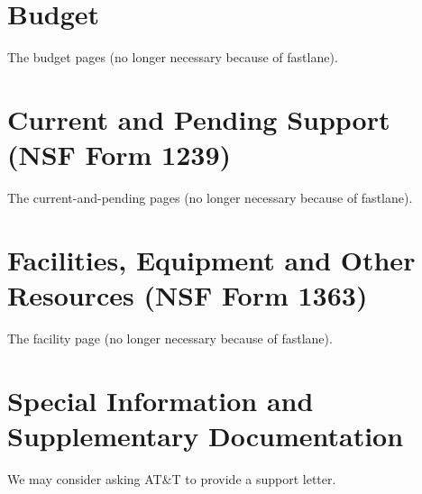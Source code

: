 \documentclass[11pt]{article}
\begin{document}
\section{Budget}

The budget pages (no longer necessary because of fastlane). 

\section{Current and Pending Support (NSF Form 1239)}

The current-and-pending pages (no longer necessary because of fastlane). 

\section{Facilities, Equipment and Other Resources (NSF Form 1363)}

The facility page (no longer necessary because of fastlane).

\section{Special Information and Supplementary Documentation}

We may consider asking AT\&{}T to provide a support letter.
\end{document}
